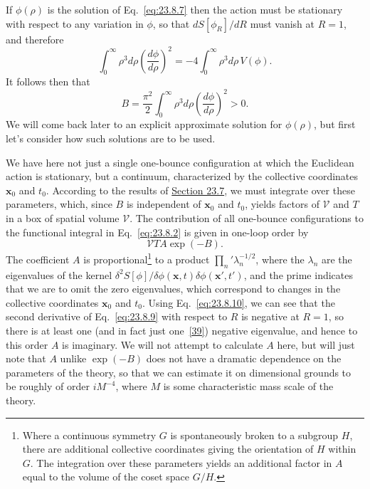 If $\phi(\rho)$ is the solution of Eq.~\eqref{eq:23.8.7} then the action must be stationary with respect to any variation in $\phi$, so that $dS[\phi_R]/dR$ must vanish at $R=1$, and therefore
\begin{equation}
 \int_0^\infty\rho^3d\rho\left(\frac{d\phi}{d\rho}\right)^2
 =-4\int_0^\infty\rho^3d\rho\,V(\phi).
 \tag{23.8.10}\label{eq:23.8.10}
\end{equation}
It follows then that
\begin{equation}
 B=\frac{\pi^2}{2}\int_0^\infty\rho^3d\rho
 \left(\frac{d\phi}{d\rho}\right)^2>0.
 \tag{23.8.11}\label{eq:23.8.11}
\end{equation}
We will come back later to an explicit approximate solution for $\phi(\rho)$, but first let's consider how such solutions are to be used.

We have here not just a single one-bounce configuration at which the Euclidean action is stationary, but a continuum, characterized by the collective coordinates $\mathbf x_0$ and $t_0$. According to the results of \hyperref[sec:23.7]{Section 23.7}, we must integrate over these parameters, which, since $B$ is independent of $\mathbf x_0$ and $t_0$, yields factors of $\mathcal V$ and $T$ in a box of spatial volume $\mathcal V$. The contribution of all one-bounce configurations to the functional integral in Eq.~\eqref{eq:23.8.2} is given in one-loop order by
\begin{equation}
 \mathcal VTA\exp(-B).
 \tag{23.8.12}\label{eq:23.8.12}
\end{equation}
The coefficient $A$ is proportional\footnote{Where a continuous symmetry $G$ is spontaneously broken to a subgroup $H$, there are additional collective coordinates giving the orientation of $H$ within $G$. The integration over these parameters yields an additional factor in $A$ equal to the volume of the coset space $G/H$.} to a product $\prod_n'\lambda_n^{-1/2}$, where the $\lambda_n$ are the eigenvalues of the kernel $\delta^2S[\phi]/\delta\phi(\mathbf x,t)\delta\phi(\mathbf x',t')$, and the prime indicates that we are to omit the zero eigenvalues, which correspond to changes in the collective coordinates $\mathbf x_0$ and $t_0$. Using Eq.~\eqref{eq:23.8.10}, we can see that the second derivative of Eq.~\eqref{eq:23.8.9} with respect to $R$ is negative at $R=1$, so there is at least one (and in fact just one~\hyperref[ch23-ref-39]{[39]}) negative eigenvalue, and hence to this order $A$ is imaginary. We will not attempt to calculate $A$ here, but will just note that $A$ unlike $\exp(-B)$ does not have a dramatic dependence on the parameters of the theory, so that we can estimate it on dimensional grounds to be roughly of order $iM^{-4}$, where $M$ is some characteristic mass scale of the theory.

